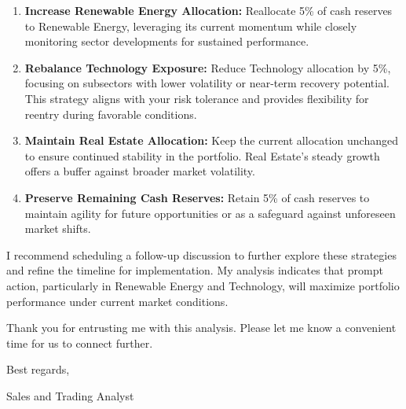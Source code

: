 \documentclass[11pt]{article}
\begin{document}
\begin{tcolorbox}[enhanced, colback=boxgray, frame hidden, arc=2mm,
    left=5mm, right=5mm, top=4mm, bottom=4mm, breakable]
\begin{enumerate}[leftmargin=1.5em, itemsep=2pt]
  \item \textbf{Increase Renewable Energy Allocation:} Reallocate 5\% of cash
  reserves to Renewable Energy, leveraging its current momentum while closely
  monitoring sector developments for sustained performance.
  \item \textbf{Rebalance Technology Exposure:} Reduce Technology allocation by
  5\%, focusing on subsectors with lower volatility or near-term recovery
  potential. This strategy aligns with your risk tolerance and provides
  flexibility for reentry during favorable conditions.
  \item \textbf{Maintain Real Estate Allocation:} Keep the current allocation
  unchanged to ensure continued stability in the portfolio. Real Estate's
  steady growth offers a buffer against broader market volatility.
  \item \textbf{Preserve Remaining Cash Reserves:} Retain 5\% of cash reserves
  to maintain agility for future opportunities or as a safeguard against
  unforeseen market shifts.
\end{enumerate}

I recommend scheduling a follow-up discussion to further explore these
strategies and refine the timeline for implementation. My analysis indicates
that prompt action, particularly in Renewable Energy and Technology, will
maximize portfolio performance under current market conditions.

Thank you for entrusting me with this analysis. Please let me know a
convenient time for us to connect further.

\medskip
Best regards,\par
[Your Full Name]\par
Sales and Trading Analyst
\end{tcolorbox}
\end{document}
